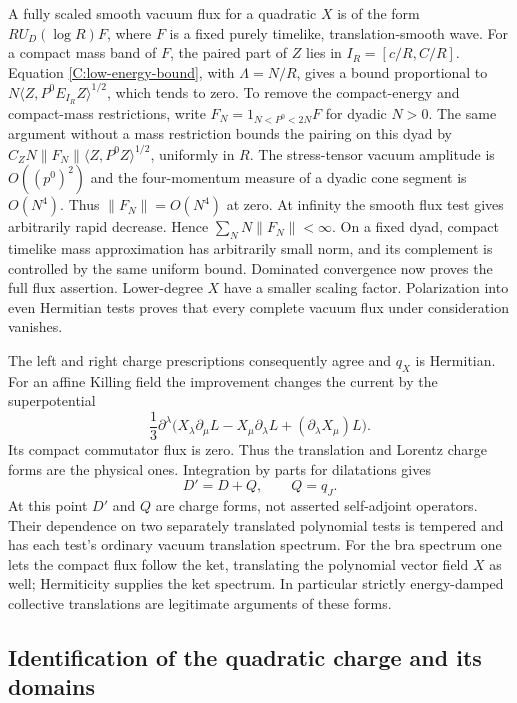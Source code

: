 A fully scaled smooth vacuum flux for a quadratic $X$ is of the
form $R U_D(\log R)F$, where $F$ is a fixed purely timelike,
translation-smooth wave. For a compact mass band of $F$, the paired
part of $Z$ lies in $I_R=[c/R,C/R]$. Equation
\eqref{C:low-energy-bound}, with $\Lambda=N/R$, gives a bound
proportional to
$N\langle Z,P^0E_{I_R}Z\rangle^{1/2}$, which tends to zero.
To remove the compact-energy and compact-mass restrictions, write
$F_N=1_{N<P^0<2N}F$ for dyadic $N>0$. The same argument without
a mass restriction bounds the pairing on this dyad by
$C_ZN\|F_N\|\langle Z,P^0Z\rangle^{1/2}$, uniformly in $R$.
The stress-tensor vacuum amplitude is $O((p^0)^2)$ and the
four-momentum measure of a dyadic cone segment is $O(N^4)$.
Thus $\|F_N\|=O(N^4)$ at zero. At infinity the smooth flux
test gives arbitrarily rapid decrease. Hence
$\sum_N N\|F_N\|<\infty$. On a fixed dyad, compact timelike
mass approximation has arbitrarily small norm, and its complement
is controlled by the same uniform bound. Dominated convergence
now proves the full flux assertion. Lower-degree $X$ have a smaller scaling
factor. Polarization into even Hermitian tests proves that every
complete vacuum flux under consideration vanishes.

The left and right charge prescriptions consequently agree and
$q_X$ is Hermitian. For an affine Killing field the improvement
changes the current by the superpotential
\begin{equation}\label{C:affine-superpotential}
 \frac13\partial^\lambda
 \bigl(X_\lambda\partial_\mu L-X_\mu\partial_\lambda L
             +(\partial_\lambda X_\mu)L\bigr).
\end{equation}
Its compact commutator flux is zero. Thus the translation and
Lorentz charge forms are the physical ones. Integration by parts
for dilatations gives
\begin{equation}\label{C:Dprime}
 D'=D+Q,\qquad Q=q_J.
\end{equation}
At this point $D'$ and $Q$ are charge forms, not asserted
self-adjoint operators. Their dependence on two separately
translated polynomial tests is tempered and has each test's ordinary
vacuum translation spectrum. For the bra spectrum one lets the
compact flux follow the ket, translating the polynomial vector
field $X$ as well; Hermiticity supplies the ket spectrum. In
particular strictly energy-damped collective translations are
legitimate arguments of these forms.

\subsection{Identification of the quadratic charge and its domains}

